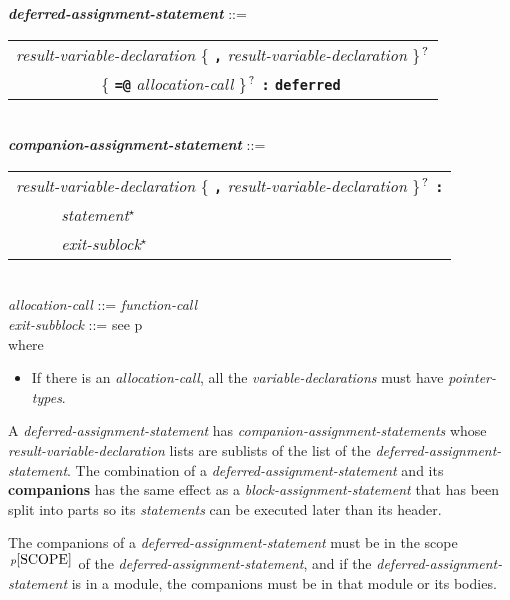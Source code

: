 \documentclass[12pt]{article}
\newcommand{\TT}[1]{{\tt \bfseries #1}}
\newcommand{\STAR}{{\Large $^\star$}}
\newcommand{\QMARK}{{$^{\,\mbox{\footnotesize ?}}$}}
\newcommand{\ttkey}[1]{{\tt \bfseries #1}}
\newcommand{\emkey}[1]{{\em \bfseries #1}}
\newcommand{\skey}[2]{{\rm \bfseries #1#2}}
\newcommand{\pagref}[1]{p\pageref{#1}}
\newcommand{\pagnote}[1]{$\,^{p\pageref{#1}}$}
\newenvironment{indpar}[1][0.3in]%
	{\begin{list}{}%
		     {\setlength{\itemsep}{0in}%
		      \setlength{\topsep}{0in}%
		      \setlength{\parsep}{1ex}%
		      \setlength{\labelwidth}{#1}%
		      \setlength{\leftmargin}{#1}%
		      \addtolength{\leftmargin}{\labelsep}}%
	 \item}%
	{\end{list}}
\begin{document}
\begin{indpar}
\emkey{deferred-assignment-statement} ::= \\
\hspace*{0.5in}
    \begin{tabular}[t]{@{}l}
        {\em result-variable-declaration}
                \{ \TT{,} {\em result-variable-declaration} \}\QMARK{} \\
	~~~~~~~~~~ \{ \TT{=@} {\em allocation-call} \}\QMARK{}
		     \TT{:} \ttkey{deferred} \\
    \end{tabular}
\\[0.5ex]
\emkey{companion-assignment-statement} ::= \\
\hspace*{0.5in}
    \begin{tabular}[t]{@{}l}
        {\em result-variable-declaration}
                \{ \TT{,} {\em result-variable-declaration} \}\QMARK{}
		 \TT{:} \\
        ~~~~~ {\em statement}\STAR{} \\
        ~~~~~ {\em exit-sublock}\STAR{} \\
    \end{tabular}
\\[0.5ex]
{\em allocation-call} ::= {\em function-call}
\\[0.5ex]
{\em exit-subblock} ::= see \pagref{EXIT-SUBBLOCK}
\\[1ex]
where
\begin{itemize}
\item If there is an {\em allocation-call}, all the
{\em variable-declarations} must have {\em pointer-types}.
\end{itemize}
\end{indpar}

A {\em deferred-assignment-statement} has
{\em companion-assignment-statements} whose {\em result-vari\-able-declaration}
lists are sublists of the list of the {\em deferred-assignment-statement}.
The combination of a {\em deferred-assignment-statement} and its
\skey{companion}s has the same effect as a {\em block-assignment-statement}
that has been split into parts so its {\em statements} can be executed
later than its header.

The companions of a {\em deferred-assignment-statement} must be in the
scope\pagnote{SCOPE} of the {\em deferred-assignment-statement}, and
if the {\em deferred-assignment-statement} is in a module, the companions
must be in that module or its bodies.
\end{document}
